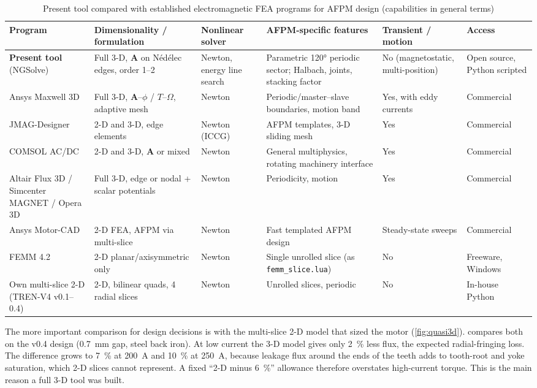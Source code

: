 \documentclass[journal]{IEEEtran}
\begin{document}
\begin{table}[!t]
\caption{Present tool compared with established electromagnetic FEA programs for AFPM design (capabilities in general terms)}\label{tab:programs}
\centering\footnotesize
\setlength{\tabcolsep}{3pt}\scriptsize
\begin{tabular}{@{}>{\raggedright}p{27mm}>{\raggedright}p{30mm}>{\raggedright}p{20mm}>{\raggedright}p{36mm}>{\raggedright}p{26mm}>{\raggedright\arraybackslash}p{22mm}@{}}
\toprule
Program & Dimensionality / formulation & Nonlinear solver & AFPM-specific features & Transient / motion & Access \\
\midrule
\textbf{Present tool} (NGSolve) & Full 3-D, $\bm{A}$ on N\'ed\'elec edges, order 1--2 & Newton, energy line search & Parametric 120\si{\degree} periodic sector; Halbach, joints, stacking factor & No (magnetostatic, multi-position) & Open source, Python scripted\\
Ansys Maxwell 3D & Full 3-D, $\bm{A}$--$\phi$ / $T$--$\Omega$, adaptive mesh & Newton & Periodic/master--slave boundaries, motion band & Yes, with eddy currents & Commercial\\
JMAG-Designer & 2-D and 3-D, edge elements & Newton (ICCG) & AFPM templates, 3-D sliding mesh & Yes & Commercial\\
COMSOL AC/DC & 2-D and 3-D, $\bm{A}$ or mixed & Newton & General multiphysics, rotating machinery interface & Yes & Commercial\\
Altair Flux 3D / Simcenter MAGNET / Opera 3D & Full 3-D, edge or nodal + scalar potentials & Newton & Periodicity, motion & Yes & Commercial\\
Ansys Motor-CAD & 2-D FEA, AFPM via multi-slice & Newton & Fast templated AFPM design & Steady-state sweeps & Commercial\\
FEMM 4.2 \cite{femm} & 2-D planar/axisymmetric only & Newton & Single unrolled slice (as \texttt{femm\_slice.lua}) & No & Freeware, Windows\\
Own multi-slice 2-D (TREN-V4 v0.1--0.4) & 2-D, bilinear quads, 4 radial slices & Newton & Unrolled slices, periodic & No & In-house Python\\
\bottomrule
\end{tabular}
\end{table}

The more important comparison for design decisions is with the multi-slice 2-D model that sized the motor (\cref{fig:quasi3d}).  compares both on the v0.4 design (\SI{0.7}{mm} gap, steel back iron). At low current the 3-D model gives only \SI{2}{\percent} less flux, the expected radial-fringing loss. The difference grows to \SI{7}{\percent} at \SI{200}{A} and \SI{10}{\percent} at \SI{250}{A}, because leakage flux around the ends of the teeth adds to tooth-root and yoke saturation, which 2-D slices cannot represent. A fixed ``2-D minus \SI{6}{\percent}'' allowance therefore overstates high-current torque. This is the main reason a full 3-D tool was built.
\end{document}
